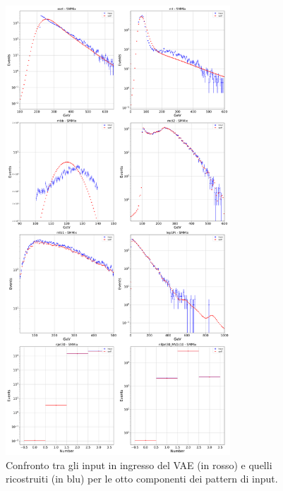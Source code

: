 \begin{figure}[h!]
	\centering
	\includegraphics[width=0.75\textwidth]{figs/risultati_simulazione/ricostruzione.png}
	\caption{Confronto tra gli input in ingresso del VAE (in rosso) e quelli ricostruiti (in blu) per le otto componenti dei pattern di input.}
	\label{ricostruzione}
\end{figure}

